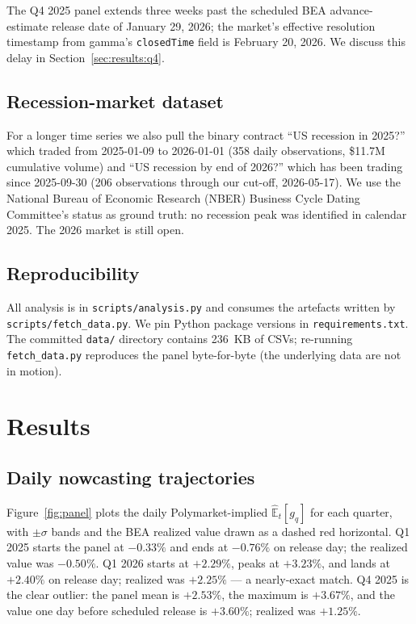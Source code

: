 \documentclass{article}
\begin{document}
The Q4 2025 panel extends three weeks past the scheduled BEA advance-estimate release
date of January 29, 2026; the market's effective resolution timestamp from gamma's
\texttt{closedTime} field is February 20, 2026. We discuss this delay in
Section~\ref{sec:results:q4}.

\subsection{Recession-market dataset}
\label{sec:experiments:recession}
For a longer time series we also pull the binary contract ``US recession in 2025?''
which traded from 2025-01-09 to 2026-01-01 (358 daily observations, \$11.7M cumulative
volume) and ``US recession by end of 2026?'' which has been trading since 2025-09-30
(206 observations through our cut-off, 2026-05-17). We use the National Bureau of
Economic Research (NBER) Business Cycle Dating Committee's status as ground truth: no
recession peak was identified in calendar 2025. The 2026 market is still open.

\subsection{Reproducibility}
All analysis is in \texttt{scripts/analysis.py} and consumes the artefacts written by
\texttt{scripts/fetch\_data.py}. We pin Python package versions in
\texttt{requirements.txt}. The committed \texttt{data/} directory contains 236~KB of CSVs;
re-running \texttt{fetch\_data.py} reproduces the panel byte-for-byte (the underlying
data are not in motion).

\section{Results}
\label{sec:results}

\subsection{Daily nowcasting trajectories}
Figure~\ref{fig:panel} plots the daily Polymarket-implied $\widehat{\mathbb{E}}_t[g_q]$ for
each quarter, with $\pm\sigma$ bands and the BEA realized value drawn as a dashed red
horizontal. Q1 2025 starts the panel at $-0.33\%$ and ends at $-0.76\%$ on release day; the
realized value was $-0.50\%$. Q1 2026 starts at $+2.29\%$, peaks at $+3.23\%$, and lands at
$+2.40\%$ on release day; realized was $+2.25\%$ --- a nearly-exact match. Q4 2025 is the
clear outlier: the panel mean is $+2.53\%$, the maximum is $+3.67\%$, and the value one
day before scheduled release is $+3.60\%$; realized was $+1.25\%$.
\end{document}
